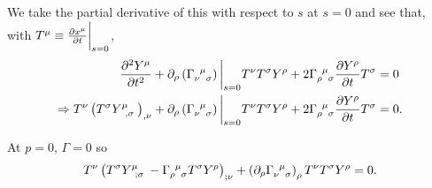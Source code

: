 We take the partial derivative of this with respect to $s$ at $s= 0$ and see that, with $T^{\mu} \equiv \pdv{x^{\mu}}{t}\bigg|_{s=0}$,
\begin{align}
    \pdv[2]{Y^{\mu}}{t} + \partial_\rho \left( \tensor{\Gamma}{_\nu^{\mu}_\sigma} \right) \bigg|_{s= 0} T^{\nu} T^{\sigma} Y^{\rho} + 2 \tensor{\Gamma}{_{\rho}^{\mu}_{\sigma}} \pdv{Y^{\rho}}{t} T^{\sigma} &= 0 \\
    \implies T^{\nu} \left( T^{\sigma} \tensor{Y}{^{\mu}_{,\sigma}} \right)_{,\nu} + \partial_\rho   \left( \tensor{\Gamma}{_{\nu}^{\mu}_{\sigma}} \right)  \bigg|_{s=0} T^{\nu} T^{\sigma} Y^{\rho} + 2 \tensor{\Gamma}{_{\rho}^{\mu}_{\sigma}} \pdv{Y^{\rho}}{t} T^{\sigma} &= 0 
.\end{align}

At $p= 0$, $\Gamma = 0$ so
\begin{align}
    T^{\nu} \left( T^{\sigma} \tensor{Y}{^{\mu}_{;\sigma}} - \tensor{\Gamma}{_{\rho}^{\mu}_{\sigma}} T^{\sigma} Y^{\rho} \right)_{;\nu} + \left( \partial_\rho \tensor{\Gamma}{_{\nu}^{\mu}_{\sigma}} \right)_{\rho} T^{\nu} T^{\sigma} Y^{\rho} = 0
.\end{align}






